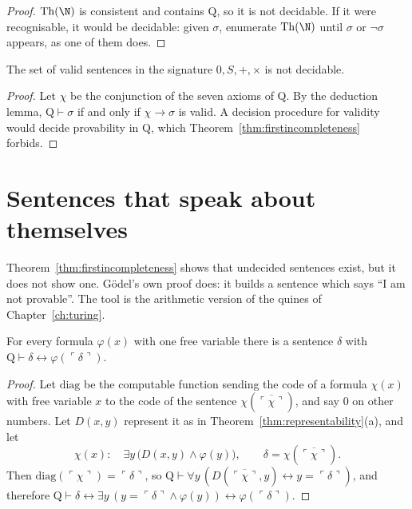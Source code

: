 \begin{proof}
$\mathrm{Th}(\N)$ is consistent and contains $\mathrm Q$, so it is not decidable. If it were recognisable, it would be decidable: given $\sigma$, enumerate $\mathrm{Th}(\N)$ until $\sigma$ or $\neg\sigma$ appears, as one of them does.
\end{proof}

\begin{corollary}[Church, 1936]\label{cor:churcharith}
The set of valid sentences in the signature $0,S,+,\times$ is not decidable.
\end{corollary}

\begin{proof}
Let $\chi$ be the conjunction of the seven axioms of $\mathrm Q$. By the deduction lemma, $\mathrm Q\vdash\sigma$ if and only if $\chi\to\sigma$ is valid. A decision procedure for validity would decide provability in $\mathrm Q$, which Theorem~\ref{thm:firstincompleteness} forbids.
\end{proof}

\section{Sentences that speak about themselves}\label{sec:selfreference}

Theorem~\ref{thm:firstincompleteness} shows that undecided sentences exist, but it does not show one. Gödel's own proof does: it builds a sentence which says ``I am not provable''. The tool is the arithmetic version of the quines of Chapter~\ref{ch:turing}.

\begin{lemma}\label{lem:diagonal}
For every formula $\varphi(x)$ with one free variable there is a sentence $\delta$ with $\mathrm Q\vdash\delta\leftrightarrow\varphi(\ulcorner\delta\urcorner)$.
\end{lemma}

\begin{proof}
Let $\mathrm{diag}$ be the computable function sending the code of a formula $\chi(x)$ with free variable $x$ to the code of the sentence $\chi(\overline{\ulcorner\chi\urcorner})$, and say $0$ on other numbers. Let $D(x,y)$ represent it as in Theorem~\ref{thm:representability}(a), and let
\[
\chi(x):\quad\exists y\,\bigl(D(x,y)\land\varphi(y)\bigr),\qquad\delta=\chi(\overline{\ulcorner\chi\urcorner}).
\]
Then $\mathrm{diag}(\ulcorner\chi\urcorner)=\ulcorner\delta\urcorner$, so $\mathrm Q\vdash\forall y\,(D(\overline{\ulcorner\chi\urcorner},y)\leftrightarrow y=\ulcorner\delta\urcorner)$, and therefore $\mathrm Q\vdash\delta\leftrightarrow\exists y\,(y=\ulcorner\delta\urcorner\land\varphi(y))\leftrightarrow\varphi(\ulcorner\delta\urcorner)$.
\end{proof}

